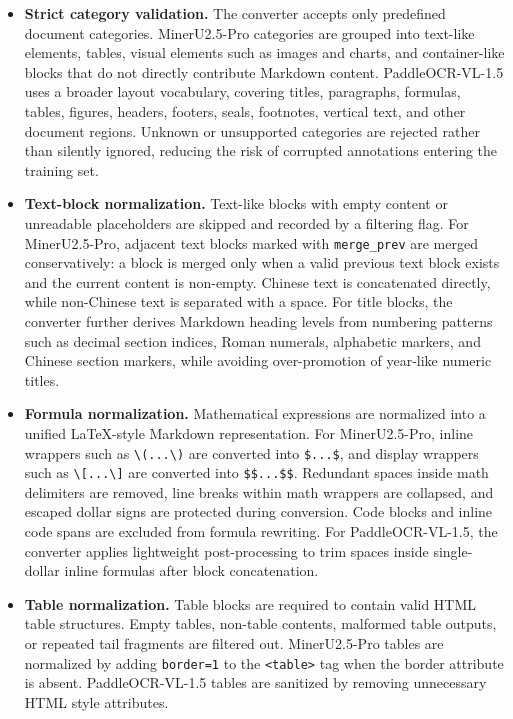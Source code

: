 \begin{itemize}
    \item \textbf{Strict category validation.}
    The converter accepts only predefined document categories. MinerU2.5-Pro categories are grouped into text-like elements, tables, visual elements such as images and charts, and container-like blocks that do not directly contribute Markdown content. PaddleOCR-VL-1.5 uses a broader layout vocabulary, covering titles, paragraphs, formulas, tables, figures, headers, footers, seals, footnotes, vertical text, and other document regions. Unknown or unsupported categories are rejected rather than silently ignored, reducing the risk of corrupted annotations entering the training set.

    \item \textbf{Text-block normalization.}
    Text-like blocks with empty content or unreadable placeholders are skipped and recorded by a filtering flag. For MinerU2.5-Pro, adjacent text blocks marked with \texttt{merge\_prev} are merged conservatively: a block is merged only when a valid previous text block exists and the current content is non-empty. Chinese text is concatenated directly, while non-Chinese text is separated with a space. For title blocks, the converter further derives Markdown heading levels from numbering patterns such as decimal section indices, Roman numerals, alphabetic markers, and Chinese section markers, while avoiding over-promotion of year-like numeric titles.

    \item \textbf{Formula normalization.}
    Mathematical expressions are normalized into a unified LaTeX-style Markdown representation. For MinerU2.5-Pro, inline wrappers such as \texttt{\textbackslash(...\textbackslash)} are converted into \texttt{\$...\$}, and display wrappers such as \texttt{\textbackslash[...\textbackslash]} are converted into \texttt{\$\$...\$\$}. Redundant spaces inside math delimiters are removed, line breaks within math wrappers are collapsed, and escaped dollar signs are protected during conversion. Code blocks and inline code spans are excluded from formula rewriting. For PaddleOCR-VL-1.5, the converter applies lightweight post-processing to trim spaces inside single-dollar inline formulas after block concatenation.

    \item \textbf{Table normalization.}
    Table blocks are required to contain valid HTML table structures. Empty tables, non-table contents, malformed table outputs, or repeated tail fragments are filtered out. MinerU2.5-Pro tables are normalized by adding \texttt{border=1} to the \texttt{<table>} tag when the border attribute is absent. PaddleOCR-VL-1.5 tables are sanitized by removing unnecessary HTML style attributes.


\end{itemize}
